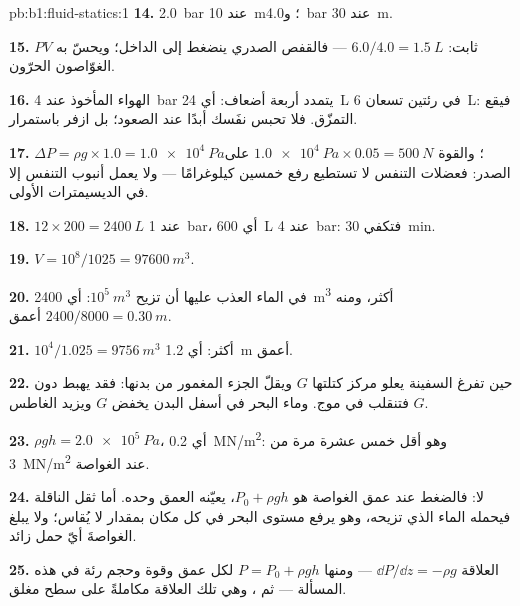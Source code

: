 \begin{solution}{pb:b1:fluid-statics:1}
\textbf{14.} \qty{2.0}{bar} عند \qty{10}{m}؛ و\qty{4.0}{bar} عند \qty{30}{m}.

\textbf{15.} $PV$ ثابت: $6.0/4.0 = \qty{1.5}{L}$ --- فالقفص الصدري
ينضغط إلى الداخل؛ ويحسّ به الغوّاصون الحرّون.

\textbf{16.} الهواء المأخوذ عند \qty{4}{bar} يتمدد أربعة أضعاف: أي \qty{24}{L} في رئتين
تسعان \qty{6}{L}: فيقع التمزّق. فلا تحبس نفَسك أبدًا عند الصعود؛ بل ازفر
باستمرار.

\textbf{17.} $\Delta P = \rho g \times 1.0 = \qty{1.0e4}{Pa}$؛ والقوة $\qty{1.0e4}{Pa}
\times 0.05 = \qty{500}{N}$ على الصدر: فعضلات التنفس لا تستطيع
رفع خمسين كيلوغرامًا --- ولا يعمل أنبوب التنفس إلا في الديسيمترات الأولى.

\textbf{18.} $12 \times 200 = \qty{2400}{L}$ عند \qty{1}{bar}، أي \qty{600}{L}
عند \qty{4}{bar}: فتكفي \qty{30}{min}.

\textbf{19.} $V = 10^8/1025 = \qty{97600}{m^3}$.

\textbf{20.} في الماء العذب عليها أن تزيح $10^5\ \unit{m^3}$: أي \qty{2400}{m^3}
أكثر، ومنه $2400/8000 = \qty{0.30}{m}$ أعمق.

\textbf{21.} $10^4/1.025 = \qty{9756}{m^3}$ أكثر: أي \qty{1.2}{m} أعمق.

\textbf{22.} حين تفرغ السفينة يعلو مركز كتلتها $G$ ويقلّ الجزء المغمور
من بدنها: فقد يهبط  دون $G$ فتنقلب في موج. وماء البحر
في أسفل البدن يخفض $G$ ويزيد الغاطس.

\textbf{23.} $\rho gh = \qty{2.0e5}{Pa}$، أي \qty{0.2}{MN/m^2}: وهو أقل خمس عشرة مرة
من \qty{3}{MN/m^2} عند الغواصة.

\textbf{24.} لا: فالضغط عند عمق الغواصة هو $P_0 + \rho gh$،
يعيّنه العمق وحده. أما ثقل الناقلة فيحمله الماء الذي
تزيحه، وهو يرفع مستوى البحر في كل مكان بمقدار لا يُقاس؛
ولا يبلغ الغواصةَ أيّ حمل زائد.

\textbf{25.} العلاقة $\dd P/\dd z = -\rho g$ --- ومنها $P = P_0 + \rho gh$ لكل
عمق وقوة وحجم رئة في هذه المسألة --- ثم ، وهي
تلك العلاقة مكاملةً على سطح مغلق.
\end{solution}
